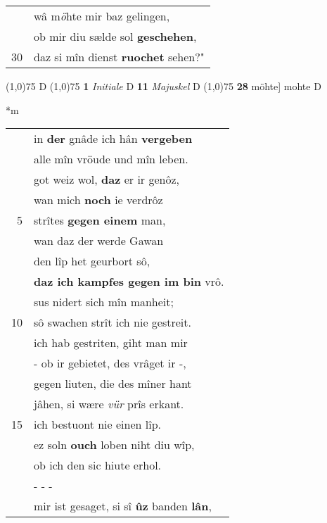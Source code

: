 \documentclass[8pt,a4paper,notitlepage]{article}
\begin{document}
\begin{table}[ht]
\begin{minipage}[t]{0.5\linewidth}
\begin{tabular}{rl}
 & wâ m\textit{ö}hte mir baz gelingen,\\ 
 & ob mir diu sælde sol \textbf{geschehen},\\ 
30 & daz si mîn dienst \textbf{ruochet} sehen?"\\ 
\end{tabular}
\scriptsize
\line(1,0){75} \newline
D \newline
\line(1,0){75} \newline
\textbf{1} \textit{Initiale} D  \textbf{11} \textit{Majuskel} D  \newline
\line(1,0){75} \newline
\textbf{28} möhte] mohte D \newline
\end{minipage}
\hspace{0.5cm}
\begin{minipage}[t]{0.5\linewidth}
\small
\begin{center}*m
\end{center}
\begin{tabular}{rl}
 & in \textbf{der} gnâde ich hân \textbf{vergeben}\\ 
 & alle mîn vröude und mîn leben.\\ 
 & got weiz wol, \textbf{daz} er ir genôz,\\ 
 & wan mich \textbf{noch} ie verdrôz\\ 
5 & strîtes \textbf{gegen einem} man,\\ 
 & wan daz der werde Gawan\\ 
 & den lîp het geurbort sô,\\ 
 & \textbf{daz ich kampfes gegen im bin} vrô.\\ 
 & sus nidert sich mîn manheit;\\ 
10 & sô swachen strît ich nie gestreit.\\ 
 & ich hab gestriten, giht man mir\\ 
 & - ob ir gebietet, des vrâget ir -,\\ 
 & gegen liuten, die des mîner hant\\ 
 & jâhen, si wære \textit{vür} prîs erkant.\\ 
15 & ich bestuont nie einen lîp.\\ 
 & ez soln \textbf{ouch} loben niht diu wîp,\\ 
 & ob ich den sic hiute erhol.\\ 
 & \multicolumn{1}{l}{ - - - }\\ 
 & mir ist gesaget, si sî \textbf{ûz} banden \textbf{lân},\\ 

\end{tabular}
\end{minipage}
\end{table}
\end{document}
